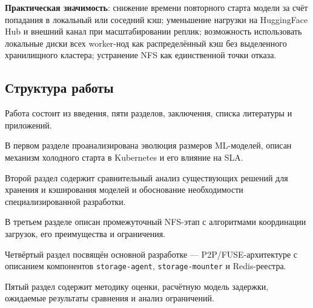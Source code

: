 \textbf{Практическая значимость}: снижение времени повторного старта модели за счёт попадания в локальный или соседний кэш; уменьшение нагрузки на HuggingFace Hub и внешний канал при масштабировании реплик; возможность использовать локальные диски всех worker-нод как распределённый кэш без выделенного хранилищного кластера; устранение NFS как единственной точки отказа.

\subsection*{Структура работы}

Работа состоит из введения, пяти разделов, заключения, списка литературы и приложений.

В первом разделе проанализирована эволюция размеров ML-моделей, описан механизм холодного старта в Kubernetes и его влияние на SLA.

Второй раздел содержит сравнительный анализ существующих решений для хранения и кэширования моделей и обоснование необходимости специализированной разработки.

В третьем разделе описан промежуточный NFS-этап с алгоритмами координации загрузок, его преимущества и ограничения.

Четвёртый раздел посвящён основной разработке --- P2P/FUSE-архитектуре с описанием компонентов \texttt{storage-agent}, \texttt{storage-mounter} и Redis-реестра.

Пятый раздел содержит методику оценки, расчётную модель задержки, ожидаемые результаты сравнения и анализ ограничений.
